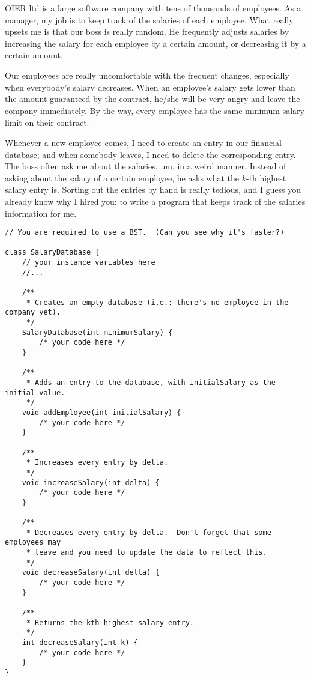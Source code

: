 \documentclass{article}
\begin{document}
OIER ltd is a large software company with tens of thousands of employees.  As a manager, my job is to keep track of the salaries of each employee.  What really upsets me is that our boss is really random.  He frequently adjusts salaries by increasing the salary for each employee by a certain amount, or decreasing it by a certain amount.

Our employees are really uncomfortable with the frequent changes, especially when everybody's salary decreases.  When an employee's salary gets lower than the amount guaranteed by the contract, he/she will be very angry and leave the company immediately.  By the way, every employee has the same minimum salary limit on their contract.

Whenever a new employee comes, I need to create an entry in our financial database; and when somebody leaves, I need to delete the corresponding entry.  The boss often ask me about the salaries, um, in a weird manner.  Instead of asking about the salary of a certain employee, he asks what the $k$-th highest salary entry is.  Sorting out the entries by hand is really tedious, and I guess you already know why I hired you: to write a program that keeps track of the salaries information for me.

\begin{verbatim}
// You are required to use a BST.  (Can you see why it's faster?)

class SalaryDatabase {
    // your instance variables here
    //...

    /**
     * Creates an empty database (i.e.: there's no employee in the company yet).
     */
    SalaryDatabase(int minimumSalary) {
        /* your code here */
    }

    /**
     * Adds an entry to the database, with initialSalary as the initial value.
     */
    void addEmployee(int initialSalary) {
        /* your code here */
    }

    /**
     * Increases every entry by delta.
     */
    void increaseSalary(int delta) {
        /* your code here */
    }

    /**
     * Decreases every entry by delta.  Don't forget that some employees may
     * leave and you need to update the data to reflect this.
     */
    void decreaseSalary(int delta) {
        /* your code here */
    }

    /**
     * Returns the kth highest salary entry.
     */
    int decreaseSalary(int k) {
        /* your code here */
    }
}
\end{verbatim}










\end{document}
